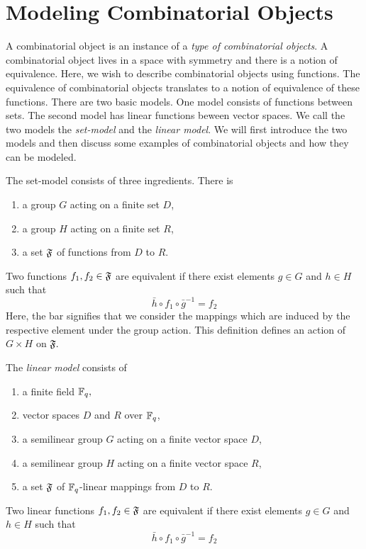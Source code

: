 \section{Modeling Combinatorial Objects}
\label{sec:modeling}


A combinatorial object is an instance of 
a {\em type of combinatorial objects}.
A combinatorial object lives in a space with symmetry and there is a notion of equivalence.
Here, we wish to describe combinatorial objects using functions. The equivalence of combinatorial objects 
translates to a notion of equivalence of these functions. 
There are two basic models. One model consists of functions between sets. 
The second model has linear functions beween vector spaces. 
We call the two models the {\em set-model} and the 
{\em linear model}.
We will first introduce the two models and then discuss some examples of combinatorial objects and 
how they can be modeled.


\bigskip


The set-model consists of three ingredients. There is 
\begin{enumerate}
\item a group $G$ acting on a finite set $D$,
\item a group $H$ acting on a finite set $R$, 
\item a set ${\mathfrak F}$ of functions from $D$ to $R$.
\end{enumerate}
Two functions $f_1,f_2 \in {\mathfrak F}$ are equivalent if there exist elements 
$g \in G$ and $h \in H$ such that 
$$
\bar{h} \circ f_1 \circ \bar{g}^{-1} = f_2 
$$
Here, the bar signifies that we consider the mappings which are induced by the 
respective element under the group action.
This definition defines an action of $G \times H$ on ${\mathfrak F}.$

\bigskip

The {\em linear model} consists of 
\begin{enumerate}
\item a finite field ${\mathbb F}_q,$
\item vector spaces $D$ and $R$ over ${\mathbb F}_q$,
\item a semilinear group $G$ acting on a finite vector space $D$,
\item a semilinear group $H$ acting on a finite vector space $R$, 
\item a set ${\mathfrak F}$ of ${\mathbb F}_q$-linear mappings from $D$ to $R$.
\end{enumerate}
Two linear functions $f_1,f_2 \in {\mathfrak F}$ are equivalent if there exist elements 
$g \in G$ and $h \in H$ such that 
$$
\bar{h} \circ f_1 \circ \bar{g}^{-1} = f_2 
$$



